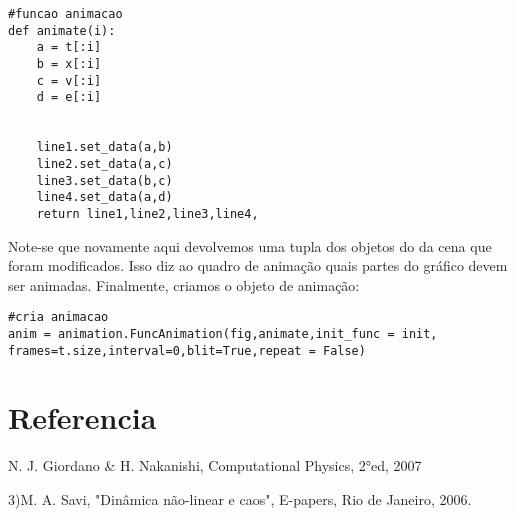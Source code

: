 \documentclass[dvipsnames,a4paper,11pt]{article}
\begin{document}
\begin{lstlisting}
#funcao animacao
def animate(i):
	a = t[:i]
	b = x[:i]
	c = v[:i]
	d = e[:i]

	
	line1.set_data(a,b)
	line2.set_data(a,c)
	line3.set_data(b,c)
	line4.set_data(a,d)
	return line1,line2,line3,line4,
\end{lstlisting}
Note-se que novamente aqui devolvemos uma tupla dos objetos do da cena que foram modificados. Isso diz ao quadro de animação quais partes do gráfico devem ser animadas.
Finalmente, criamos o objeto de animação:

\begin{lstlisting}	
#cria animacao
anim = animation.FuncAnimation(fig,animate,init_func = init, frames=t.size,interval=0,blit=True,repeat = False)
\end{lstlisting}


\section{Referencia}

\noindent 

N. J. Giordano \& H. Nakanishi, Computational Physics, 2°ed, 2007

3)M. A. Savi, "Din\^amica n\~ao-linear e caos", E-papers, Rio de Janeiro, 2006.
\end{document}
